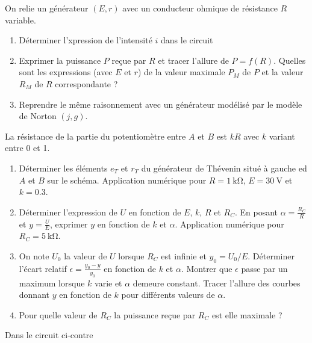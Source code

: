 \begin{exercice}
	On relie un générateur $(E, r)$ avec un conducteur ohmique de résistance $R$ variable.
	\begin{enumerate}
		\item Déterminer l'xpression de l'intensité $i$ dans le circuit
		\item Exprimer la puissance $P$ reçue par $R$ et tracer l'allure de $P=f(R)$. Quelles sont les expressions (avec $E$ et $r$) de la valeur maximale $P_M$ de $P$ et la valeur $R_M$ de $R$ correspondante ?
		\item Reprendre le même raisonnement avec un générateur modélisé par le modèle de Norton $(j, g)$.
	\end{enumerate}
\end{exercice}

\begin{exercice}
La résistance de la partie du potentiomètre entre $A$ et $B$ est $kR$ avec $k$ variant entre 0 et 1.
	\begin{enumerate}
		\item Déterminer les éléments $e_T$ et $r_T$ du générateur de Thévenin situé à gauche ed $A$ et $B$ sur le schéma. Application numérique pour $R=\SI{1}{\kilo\ohm}$, $E=\SI{30}{\volt}$ et $k=0.3$.
		\item Déterminer l'expression de $U$ en fonction de $E$, $k$, $R$ et $R_C$. En posant $\alpha = \frac{R_C}{R}$ et $y= \frac{U}{E}$, exprimer $y$ en fonction de $k$ et $\alpha$. Application numérique pour $R_C=\SI{5}{\kilo\ohm}$.
		\item On note $U_0$ la valeur de $U$ lorsque $R_C$ est infinie et $y_0 = U_0/E$. Déterminer l'écart relatif $\epsilon = \frac{y_0-y}{y_0}$ en fonction de $k$ et $\alpha$. Montrer que $\epsilon$ passe par un maximum lorsque $k$ varie et $\alpha$ demeure constant. Tracer l'allure des courbes donnant $y$ en fonction de $k$ pour différents valeurs de $\alpha$.
		\item Pour quelle valeur de $R_C$ la puissance reçue par $R_C$ est elle maximale ?
	\end{enumerate}
\end{exercice}

\begin{exercice}
	Dans le circuit ci-contre
\end{exercice}
